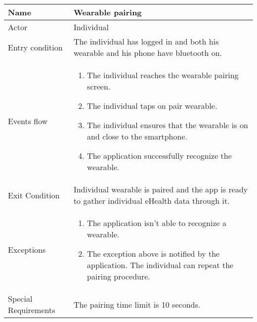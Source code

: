\begin{tabular}{|l|p{13cm}|}
    \hline
    Name & Wearable pairing
    \\ \hline
    Actor & Individual
    \\ \hline 
    Entry condition & The individual has logged in and both his wearable and his phone have bluetooth on.
    \\ \hline
    Events flow &
    \begin{enumerate}
    \item The individual reaches the wearable pairing screen.
    \item The individual taps on pair wearable.
    \item The individual ensures that the wearable is on and close to the smartphone.
    \item The application successfully recognize the wearable.
    \end{enumerate}
     \\ \hline
     Exit Condition & Individual wearable is paired and the app is ready to gather individual eHealth data through it.
     \\
    \hline
    Exceptions &
        \begin{enumerate}
    \item The application isn't able to recognize a wearable. 
    \item The exception above is notified by the application. The individual can repeat the pairing procedure.
    \end{enumerate}
      \\
    \hline
    Special Requirements & The pairing time limit is 10 seconds.
\end{tabular}

